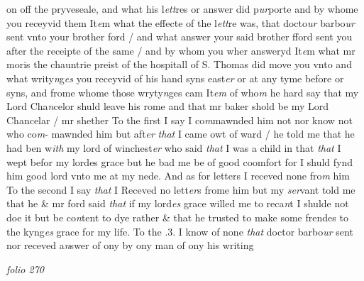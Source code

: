 \documentclass[12pt, a4paper]{book}
\begin{document}
               on off
			 the pryveseale, and what his l\textit{ett}res or answer did p\textit{ur}porte and by whome you receyvid them 
				\marginpar[\vspace{0.5cm}{\textcolor{Gray}{3}}]{}
			 It\textit{e}m what the effecte of the l\textit{ett}re was, that docto\textit{ur} barbo\textit{ur}  sent vnto your brother ford / and what answer your said brother fford sent you after the receipte of the same / and by whom you wher answeryd 
				\marginpar[\vspace{0.5cm}{\textcolor{Gray}{4}}]{}
			 It\textit{e}m what mr moris the chauntrie preist of the hospitall of S. Thomas did move you vnto and what writy\textit{n}g\textit{es} you receyvid of his hand syns east\textit{er} or at any tyme before or syns, and frome whome those wryty\textit{n}ges  cam 
				\marginpar[\vspace{0.5cm}{\textcolor{Gray}{5}}]{}
			 It\textit{em} of who\textit{m} he hard say that my Lord Cha\textit{n}celor shuld leave his rome and that mr baker shold be my Lord Chancelar / mr shether To the first I say I co\textit{m}mawnded him not nor know not who co\textit{m}- mawnded him but aft\textit{er}
               \textit{that} I came owt of ward / he told me that 
				\marginpar[\vspace{0.5cm}{\textcolor{Gray}{servand}}]{}
			 he had ben w\textit{ith} my lord of winchest\textit{er} who said \textit{that} I was a child in  that \textit{that} I wept befor my lordes grace but he bad me be of good coomfort for I shuld fynd him good lord vnto me at my nede. And as for letters I receved none fro\textit{m} him To the second I say \textit{that} I Receved no lett\textit{er}s frome him but my  
				\marginpar[\vspace{0.5cm}{\textcolor{Gray}{ford}}]{}
			\textit{ ser}vant told me that he \& mr ford
			 said \textit{that} if my lord\textit{es} grace willed me to reca\textit{n}t I shulde not doe it but be co\textit{n}tent to dye rather \& that he trusted to  make some frendes to the kyng\textit{es} grace for my life. To the .3. I know of none \textit{that} doctor barbo\textit{ur} sent nor receved a\textit{n}swer  of ony by ony man of ony his writing

\dotfill
					

\textit{folio 270}
\end{document}
